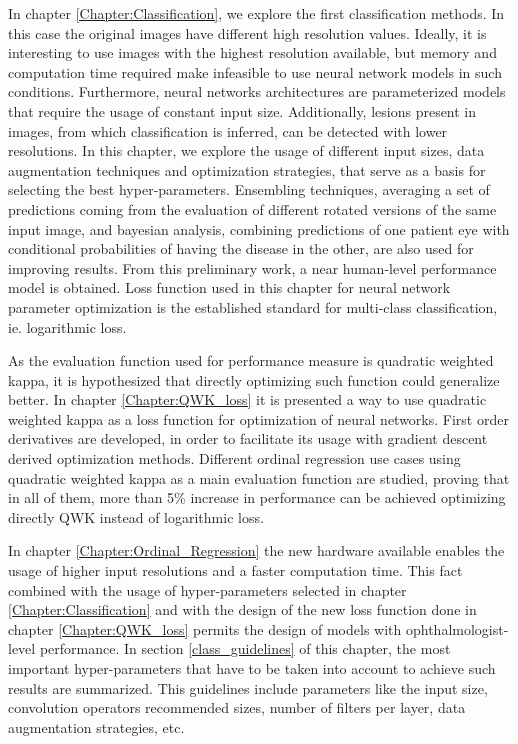 In chapter \ref{Chapter:Classification}, we explore the first classification methods. In this case the original images have different high resolution values. Ideally, it is interesting to use images with the highest resolution available, but memory and computation time required make infeasible to use neural network models in such conditions. Furthermore, neural networks architectures are parameterized models that require the usage of constant input size. Additionally, lesions present in images, from which classification is inferred, can be detected with lower resolutions. In this chapter, we explore the usage of different input sizes, data augmentation techniques and optimization strategies, that serve as a basis for selecting the best hyper-parameters. Ensembling techniques, averaging a set of predictions coming from the evaluation of different rotated versions of the same input image, and bayesian analysis, combining predictions of one patient eye with conditional probabilities of having the disease in the other, are also used for improving results. From this preliminary work, a near human-level performance model is obtained. Loss function used in this chapter for neural network parameter optimization is the established standard for multi-class classification, ie. logarithmic loss.

As the evaluation function used for performance measure is quadratic weighted kappa, it is hypothesized that directly optimizing such function could generalize better. In chapter \ref{Chapter:QWK_loss} it is presented a way to use quadratic weighted kappa as a loss function for optimization of neural networks. First order derivatives are developed, in order to facilitate its usage with gradient descent derived optimization methods. Different ordinal regression use cases using quadratic weighted kappa as a main evaluation function are studied, proving that in all of them, more than 5\% increase in performance can be achieved optimizing directly QWK instead of logarithmic loss. 

In chapter \ref{Chapter:Ordinal_Regression} the new hardware available enables the usage of higher input resolutions and a faster computation time. This fact combined with the usage of hyper-parameters selected in chapter \ref{Chapter:Classification} and with the design of the new loss function done in chapter \ref{Chapter:QWK_loss} permits the design of models with ophthalmologist-level performance. In section \ref{class_guidelines} of this chapter, the most important hyper-parameters that have to be taken into account to achieve such results are summarized. This guidelines include parameters like the input size, convolution operators recommended sizes, number of filters per layer, data augmentation strategies, etc.

